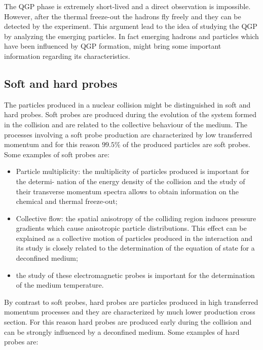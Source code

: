 The QGP phase is extremely short-lived and a direct observation is impossible.
However, after the thermal freeze-out the hadrons fly freely and they can be detected by the experiment.
This argument lead to the idea of studying the QGP by analyzing the emerging particles.
In fact emerging hadrons and particles which have been influenced by QGP formation, might bring some important information regarding its characteristics.

\subsection{Soft and hard probes}
The particles produced in a nuclear collision might be distinguished in soft and hard probes.
Soft probes are produced during the evolution of the system formed in the collision and are related to the collective behaviour of the medium.
The processes involving a soft probe production are characterized by low transferred momentum and for this reason $99.5\%$ of the produced particles are soft probes.
Some examples of soft probes are:
\begin{itemize}
    \item Particle multiplicity: the multiplicity of particles produced is important for the determi- nation of the energy density of the collision and the study of their transverse momentum spectra allows to obtain information on the chemical and thermal freeze-out;
    \item Collective flow: the spatial anisotropy of the colliding region induces pressure gradients which cause anisotropic particle distributions. This effect can be explained as a collective motion of particles produced in the interaction and its study is closely related to the determination of the equation of state for a deconfined medium;
    \item the study of these electromagnetic probes is important for the determination of the medium temperature.
\end{itemize}
By contrast to soft probes, hard probes are particles produced in high transferred momentum processes and they are characterized by much lower production cross section.
For this reason hard probes are produced early during the collision and can be strongly influenced by a deconfined medium.
Some examples of hard probes are:
